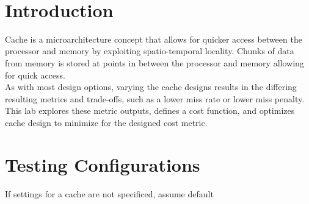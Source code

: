\documentclass[twocolumn]{article}
\begin{document}
\

{\newpage}

\maketitle        


\section{Introduction}

Cache is a microarchitecture concept that allows for quicker access between the processor and memory by exploiting spatio-temporal locality. Chunks of data from memory is stored at points in between the processor and memory allowing for quick access. \\

As with most design options, varying the cache designs results in the differing resulting metrics and trade-offs, such as a lower miss rate or lower miss penalty. This lab explores these metric outputs, defines a cost function, and optimizes cache design to minimize for the designed cost metric. 

\section{Testing Configurations}

If settings for a cache are not specificed, assume default


\end{document}
